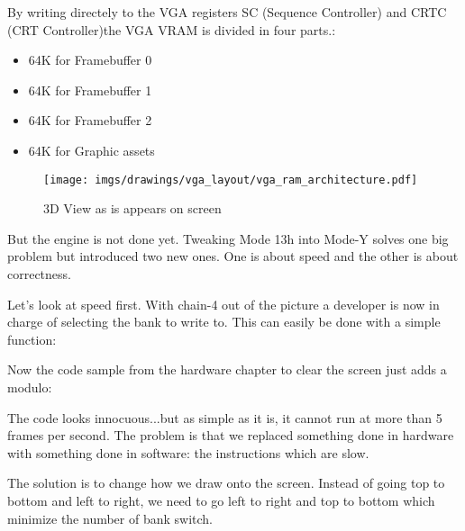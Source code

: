 \documentclass[book.tex]{subfiles}
\begin{document}
 \par
 \begin{minipage}{\textwidth}

\end{minipage}
 \par
 By writing directely to the VGA registers SC (Sequence Controller) and CRTC (CRT Controller)the VGA VRAM is divided in four parts.:
 \begin{itemize}\label{SetupPages}
 \item 64K for Framebuffer 0
 \item 64K for Framebuffer 1
 \item 64K for Framebuffer 2
 \item 64K for Graphic assets
\end{itemize}
\par
\begin{figure}[H]
\centering
 \texttt{[image: imgs/drawings/vga\_layout/vga\_ram\_architecture.pdf]}
 \caption{3D View as is appears on screen} \label{fig:vga_layout_in_3D}
 \end{figure}
\par
But the engine is not done yet. Tweaking Mode 13h into Mode-Y solves one big problem but introduced two new ones. One is about speed and the other is about correctness.\\
\par
Let's look at speed first. With chain-4 out of the picture a developer is now in charge of selecting the bank to write to. This can easily be done with a simple function:\\
\par
 \par
 \begin{minipage}{\textwidth}

\end{minipage}
 \par

Now the code sample from the hardware chapter to clear the screen just adds a modulo:\\
\par
\par
\begin{minipage}{\textwidth}

\end{minipage}
\par
The code looks innocuous...but as simple as it is, it cannot run at more than 5 frames per second. The problem is that we replaced something done in hardware with something done in software: the  instructions which are slow.\\
\par
The solution is to change how we draw onto the screen. Instead of going top to bottom and left to right, we need to go left to right and top to bottom which minimize the number of bank switch.\\
\par
\begin{minipage}{\textwidth}

\end{minipage}
\end{document}
